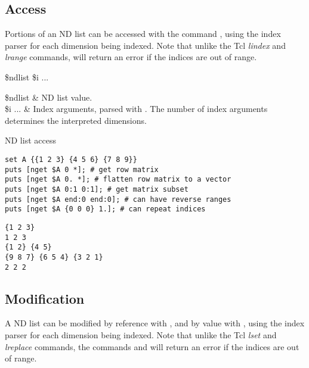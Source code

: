 \documentclass{article}
\begin{document}
\clearpage
\subsection{Access}
Portions of an ND list can be accessed with the command , using the index parser  for each dimension being indexed.
Note that unlike the Tcl \textit{lindex} and \textit{lrange} commands,  will return an error if the indices are out of range.
\begin{syntax}
 \$ndlist \$i ...
\end{syntax}
\begin{args}
\$ndlist & ND list value. \\
\$i ... & Index arguments, parsed with . 
The number of index arguments determines the interpreted dimensions.
\end{args}
\begin{example}{ND list access}
\begin{lstlisting}
set A {{1 2 3} {4 5 6} {7 8 9}}
puts [nget $A 0 *]; # get row matrix
puts [nget $A 0. *]; # flatten row matrix to a vector
puts [nget $A 0:1 0:1]; # get matrix subset
puts [nget $A end:0 end:0]; # can have reverse ranges
puts [nget $A {0 0 0} 1.]; # can repeat indices
\end{lstlisting}
\tcblower
\begin{lstlisting}
{1 2 3}
1 2 3
{1 2} {4 5}
{9 8 7} {6 5 4} {3 2 1}
2 2 2
\end{lstlisting}
\end{example}

\clearpage
\subsection{Modification}
A ND list can be modified by reference with , and by value with , using the index parser  for each dimension being indexed.
Note that unlike the Tcl \textit{lset} and \textit{lreplace} commands, the commands  and  will return an error if the indices are out of range.
\end{document}
